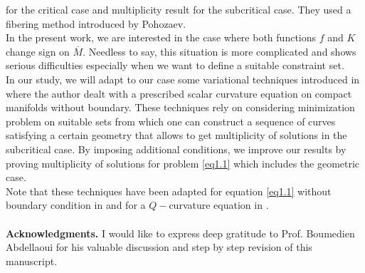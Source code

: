 \documentclass{Tran-l}
\theoremstyle{definition}
\theoremstyle{remark}
\numberwithin{equation}{section}
\begin{document}
for the critical case and multiplicity result for the subcritical
case. They used a fibering method introduced by Pohozaev\cite{phozaev}.\\
In the present work, we are interested  in the case where both
functions $f$ and $K$ change sign on $\overline M$. Needless to say,
this situation is more complicated and shows serious difficulties
especially when we want to define a suitable constraint set.\\
In our study, we will adapt to our case some variational techniques
introduced in \cite{rauzy} where the author dealt  with a prescribed
scalar curvature equation on compact manifolds without boundary.
These techniques rely on considering minimization problem on
suitable sets from which one can construct a sequence of curves
satisfying a certain geometry that allows to get multiplicity of
solutions in the subcritical case. By imposing additional
conditions, we improve our results by proving
multiplicity of solutions for problem \eqref{eq1.1} which includes the geometric case.\\
Note that these techniques have been adapted for equation
\eqref{eq1.1} without boundary condition in \cite{BenaliliMaliki3}
and for a $Q-$curvature equation in
\cite{Benalili}.\\\\
 {\bf Acknowledgments.} I would like to express deep gratitude to
Prof. Boumedien Abdellaoui for his valuable discussion and step by
step revision of this manuscript.
\end{document}

